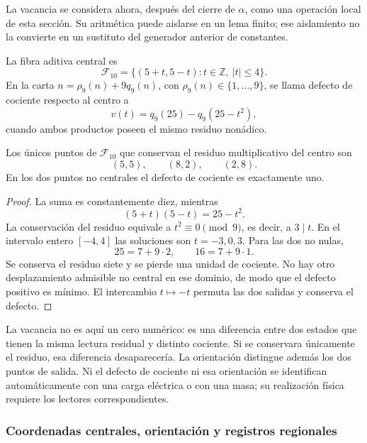 La vacancia se considera ahora, después del cierre de \(\alpha\), como
una operación local de esta sección. Su aritmética puede aislarse en un
lema finito; ese aislamiento no la convierte en un sustituto del
generador anterior de constantes.

\begin{definition}
La fibra aditiva central es
\[
 \mathcal F_{10}
 =\{(5+t,5-t):t\in\mathbb Z,\ |t|\leq4\}.
\]
En la carta \(n=\rho_9(n)+9q_9(n)\), con
\(\rho_9(n)\in\{1,\ldots,9\}\), se llama defecto de cociente respecto
al centro a
\[
 v(t)=q_9(25)-q_9(25-t^2),
\]
cuando ambos productos poseen el mismo residuo nonádico.
\end{definition}

\begin{lemma}
Los únicos puntos de \(\mathcal F_{10}\) que conservan el residuo
multiplicativo del centro son
\[
 (5,5),\qquad (8,2),\qquad (2,8).
\]
En los dos puntos no centrales el defecto de cociente es exactamente uno.
\end{lemma}
\begin{proof}
La suma es constantemente diez, mientras
\[
 (5+t)(5-t)=25-t^2.
\]
La conservación del residuo equivale a \(t^2\equiv0\pmod9\), es decir,
a \(3\mid t\). En el intervalo entero \([-4,4]\) las soluciones son
\(t=-3,0,3\). Para las dos no nulas,
\[
 25=7+9\cdot2,\qquad16=7+9\cdot1.
\]
Se conserva el residuo siete y se pierde una unidad de cociente. No hay
otro desplazamiento admisible no central en ese dominio, de modo que el
defecto positivo es mínimo. El intercambio \(t\mapsto-t\) permuta las
dos salidas y conserva el defecto.
\end{proof}

La vacancia no es aquí un cero numérico: es una diferencia entre dos
estados que tienen la misma lectura residual y distinto cociente. Si se
conservara únicamente el residuo, esa diferencia desaparecería. La
orientación distingue además los dos puntos de salida. Ni el defecto de
cociente ni esa orientación se identifican automáticamente con una carga
eléctrica o con una masa; su realización física requiere los lectores
correspondientes.


\subsubsection{Coordenadas centrales, orientación y registros regionales}
\label{x_reciprocidad:el-centro:registros}

